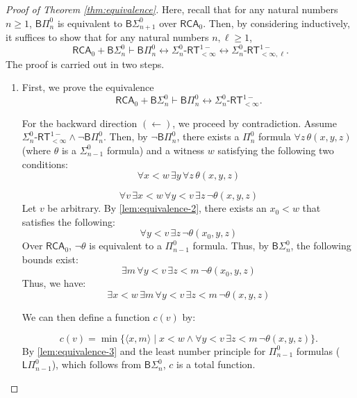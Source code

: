 \documentclass[10pt,reqno]{amsart}
\numberwithin{equation}{section}
\begin{document}
\begin{proof}[Proof of Theorem \ref{thm:equivalence}]
Here, recall that for any natural numbers $n \ge 1$, $\mathsf{B}\Pi_{n}^{0}$ is equivalent to $\mathsf{B}\Sigma_{n+1}^{0}$ over $\mathsf{RCA}_0$.
Then, by considering inductively, it suffices to show that for any natural numbers $n,\ell \ge 1$,
\[\mathsf{RCA}_0+\mathsf{B}\Sigma_{n}^{0}\vdash\mathsf{B}\Pi_{n}^{0}\leftrightarrow\Sigma_{n}^{0}\text{-}\mathsf{RT}_{<\infty}^{1-}\leftrightarrow\Sigma_{n}^{0}\text{-}\mathsf{RT}_{<\infty,\ell}^{1-}.
\]
The proof is carried out in two steps.


\begin{enumerate}[label=(\roman*),topsep=0.5em,itemsep=0.5em]
\item First, we prove the equivalence \[\mathsf{RCA}_0+\mathsf{B}\Sigma_{n}^{0}\vdash\mathsf{B}\Pi_{n}^{0}\leftrightarrow\Sigma_{n}^{0}\text{-}\mathsf{RT}_{<\infty}^{1-}.\]


For the backward direction $(\leftarrow)$, we proceed by contradiction. Assume $\Sigma_{n}^{0}\text{-}\mathsf{RT}_{<\infty}^{1-}\land\neg\mathsf{B}\Pi_{n}^{0}$. Then, by $\neg\mathsf{B}\Pi_{n}^{0}$, there exists a $\Pi_{n}^{0}$ formula $\forall z \, \theta(x,y,z)$ (where $\theta$ is a $\Sigma_{n-1}^{0}$ formula) and a witness $w$ satisfying the following two conditions:
\begin{equation}
\forall x < w \, \exists y \, \forall z \, \theta(x,y,z) \label{lem:equivalence-1}
\end{equation}


\begin{equation} \forall v \, \exists x < w \, \forall y < v \, \exists z \, \neg\theta(x,y,z) \label{lem:equivalence-2}
\end{equation}
Let $v$ be arbitrary. By \eqref{lem:equivalence-2}, there exists an $x_0<w$ that satisfies the following:
\[
\forall y < v \, \exists z \, \neg\theta(x_0,y,z)
\]
Over $\mathsf{RCA}_0$, $\neg\theta$ is equivalent to a $\Pi_{n-1}^{0}$ formula. Thus, by $\mathsf{B}\Sigma_{n}^{0}$, the following bounds exist:
\[
\exists m \, \forall y < v \, \exists z < m \, \neg\theta(x_0,y,z)
\]
Thus, we have:
\begin{equation} \exists x < w \, \exists m \, \forall y < v \, \exists z < m \, \neg\theta(x,y,z) \label{lem:equivalence-3}
\end{equation}


We can then define a function $c(v)$ by:


\begin{equation} c(v)=\min\{ \langle x,m \rangle \mid x < w \land \forall y < v \, \exists z < m \, \neg\theta(x,y,z) \}.
\end{equation}
By \eqref{lem:equivalence-3} and the least number principle for $\Pi_{n-1}^{0}$ formulas ($\mathsf{L}\Pi_{n-1}^{0}$), which follows from $\mathsf{B}\Sigma_{n}^{0}$, $c$ is a total function.



\end{enumerate}
\end{proof}
\end{document}
